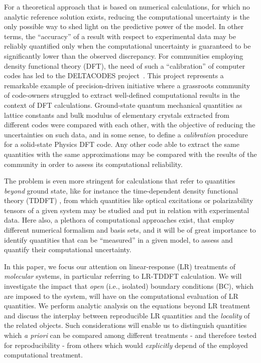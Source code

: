 \documentclass[reprint,aps,prb]{revtex4-1}
\begin{document}
For a theoretical approach that is based on numerical calculations, for which no analytic reference solution exists,
reducing the computational uncertainty is the only possible way to shed light on the predictive power of the
model. In other terms, the ``accuracy'' of a result with respect to experimental data may be reliably quantified
only when the computational uncertainty is guaranteed to be significantly lower than the observed discrepancy.
For communities employing density functional theory (DFT), the need of such a ``calibration'' of computer codes has led to the DELTACODES project~\cite{deltaTest2016}.
This project represents a remarkable example of precision-driven initiative where a grassroots community of code-owners struggled to extract
well-defined computational results in the context of DFT calculations. Ground-state quantum mechanical quantities
as lattice constants and bulk modulus of elementary crystals extracted from different codes were compared with each other, with the objective of reducing the uncertainties on such data, and in some sense, to define a \emph{calibration} procedure for a solid-state Physics DFT code.
Any other code able to extract the same quantities with the same approximations may be compared with the
results of the community in order to assess its computational reliability.

The problem is even more stringent for calculations that refer to quantities \emph{beyond} ground state, like
for instance the time-dependent density functional theory (TDDFT) \cite{casida1995,runge1984,onida2002},
from which quantities like optical excitations or polarizability tensors
of a given system may be studied and put in relation with experimental data.
Here also, a plethora of computational approaches exist, that employ different numerical formalism and
basis sets, and it will be of great importance to identify quantities that can be ``measured'' in a given model, to assess
and quantify their computational uncertainty.

In this paper, we focus our attention on linear-response (LR) treatments of \emph{molecular} systems,
in particular referring to LR-TDDFT calculation. We will investigate the impact that \emph{open} (i.e., isolated) boundary conditions (BC), which are imposed to the system, will have on the computational evaluation of LR quantities.
We perform analytic analysis on the equations beyond LR treatment and discuss the interplay between reproducible LR quantities and the \emph{locality} of the related objects. Such considerations will enable us to distinguish quantities which \textit{a priori} can be compared among different treatments - and therefore tested for reproducibility - from others which would \emph{explicitly} depend of the employed computational treatment.
\end{document}
